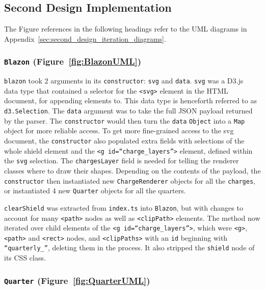 \documentclass[nobib, a4paper, twoside, justified]{tufte-book}
\makeatletter
\newcommand{\svg}{\gls{svg}\@\xspace}
\newcommand{\charges}{\glspl{charge}\@\xspace}
\newcommand{\quarters}{\glspl{quarter}\@\xspace}
\newcommand{\ublazon}{\Gls{blazon}\@\xspace}
\newcommand{\payload}{\gls{payload}\@\xspace}
\makeatother
\begin{document}
\subsection{Second Design Implementation}%
\label{sub:second_design_implementation}

The Figure references in the following headings refer to the UML diagrams in
Appendix~\ref{sec:second_design_iteration_diagrams}.

\subsubsection{\texttt{Blazon} (Figure~\ref{fig:BlazonUML})}%
\label{ssub:blazon}

\texttt{\ublazon} took 2 arguments in its \texttt{constructor}: \texttt{svg} and \texttt{data}.
\texttt{svg} was a D3.js~\autocite{d3js} data type that contained a selector for the \texttt{<svg>}
element in the HTML document, for appending elements to. This data type is henceforth referred to
as \texttt{d3.Selection}. The \texttt{data} argument was to take the full JSON \payload returned by
the parser. The \texttt{constructor} would then turn the \texttt{data} \texttt{Object} into a
\texttt{Map} object for more reliable access. To get more fine-grained access to the \svg document,
the \texttt{constructor} also populated extra fields with selections of the whole shield element
and the \texttt{<g id=``charge\_layers''>} element, defined within the \texttt{svg} selection. The
\texttt{chargesLayer} field is needed for telling the renderer classes where to draw their shapes.
Depending on the contents of the \payload, the \texttt{constructor} then instantiated new
\texttt{ChargeRenderer} objects for all the \texttt{\charges}, or instantiated 4 new
\texttt{Quarter} objects for all the \quarters.

\texttt{clearShield} was extracted from \texttt{index.ts} into \texttt{Blazon}, but with changes to
account for many \texttt{<path>} nodes as well as \texttt{<clipPath>} elements. The method now
iterated over child elements of the \texttt{<g id=``charge\_layers''>}, which were \texttt{<g>},
\texttt{<path>} and \texttt{<rect>} nodes, and \texttt{<clipPaths>} with an \texttt{id} beginning
with \texttt{``quarterly\_''}, deleting them in the process. It also stripped the \texttt{shield}
node of its CSS class.

\subsubsection{\texttt{Quarter} (Figure~\ref{fig:QuarterUML})}%
\label{ssub:quarter}
\end{document}

